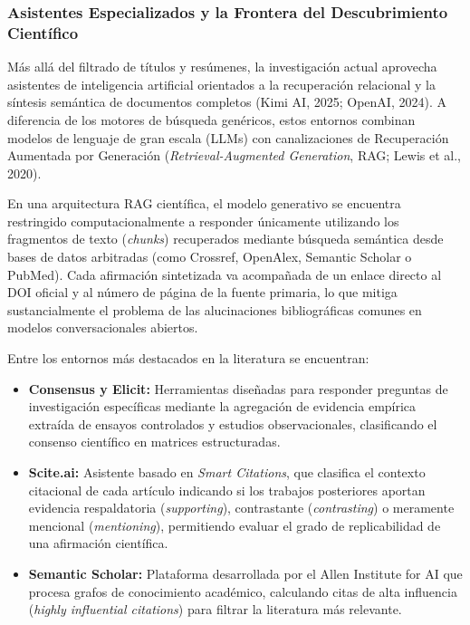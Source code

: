 \subsubsection{Asistentes Especializados y la Frontera del Descubrimiento Científico}

Más allá del filtrado de títulos y resúmenes, la investigación actual aprovecha asistentes de inteligencia artificial orientados a la recuperación relacional y la síntesis semántica de documentos completos (Kimi AI, 2025; OpenAI, 2024). A diferencia de los motores de búsqueda genéricos, estos entornos combinan modelos de lenguaje de gran escala (LLMs) con canalizaciones de Recuperación Aumentada por Generación (\textit{Retrieval-Augmented Generation}, RAG; Lewis et al., 2020).

En una arquitectura RAG científica, el modelo generativo se encuentra restringido computacionalmente a responder únicamente utilizando los fragmentos de texto (\textit{chunks}) recuperados mediante búsqueda semántica desde bases de datos arbitradas (como Crossref, OpenAlex, Semantic Scholar o PubMed). Cada afirmación sintetizada va acompañada de un enlace directo al DOI oficial y al número de página de la fuente primaria, lo que mitiga sustancialmente el problema de las alucinaciones bibliográficas comunes en modelos conversacionales abiertos.

Entre los entornos más destacados en la literatura se encuentran:
\begin{itemize}
    \item \textbf{Consensus y Elicit:} Herramientas diseñadas para responder preguntas de investigación específicas mediante la agregación de evidencia empírica extraída de ensayos controlados y estudios observacionales, clasificando el consenso científico en matrices estructuradas.
    \item \textbf{Scite.ai:} Asistente basado en \textit{Smart Citations}, que clasifica el contexto citacional de cada artículo indicando si los trabajos posteriores aportan evidencia respaldatoria (\textit{supporting}), contrastante (\textit{contrasting}) o meramente mencional (\textit{mentioning}), permitiendo evaluar el grado de replicabilidad de una afirmación científica.
    \item \textbf{Semantic Scholar:} Plataforma desarrollada por el Allen Institute for AI que procesa grafos de conocimiento académico, calculando citas de alta influencia (\textit{highly influential citations}) para filtrar la literatura más relevante.
\end{itemize}


